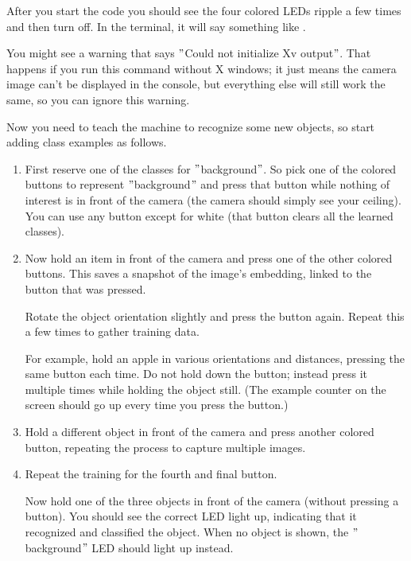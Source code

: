 After you start the code you should see the four colored LEDs ripple a few times and then turn off. In the terminal, it will say something like .

\begin{notes}
	\item You might see a warning that says $"$Could not initialize Xv output$"$. That happens if you run this command without X windows; it just means the camera image can't be displayed in the console, but everything else will still work the same, so you can ignore this warning.
\end{notes}


Now you need to teach the machine to recognize some new objects, so start adding class examples as follows.

\begin{enumerate}
	\item First reserve one of the classes for $"$background$"$. So pick one of the colored buttons to represent $"$background$"$ and press that button while nothing of interest is in front of the camera (the camera should simply see your ceiling). You can use any button except for white (that button clears all the learned classes).
	
	\item Now hold an item in front of the camera and press one of the other colored buttons. This saves a snapshot of the image's embedding, linked to the button that was pressed.
	
	\medskip
	
	Rotate the object orientation slightly and press the button again. Repeat this a few times to gather training data.
	
	\medskip
	
	For example, hold an apple in various orientations and distances, pressing the same button each time. Do not hold down the button; instead press it multiple times while holding the object still. (The example counter on the screen should go up every time you press the button.)
	
	
	\item Hold a different object in front of the camera and press another colored button, repeating the process to capture multiple images.
	
	
	\item Repeat the training for the fourth and final button.
	
	\medskip
	
	Now hold one of the three objects in front of the camera (without pressing a button). You should see the correct LED light up, indicating that it recognized and classified the object. When no object is shown, the $"$background$"$ LED should light up instead.
	

\end{enumerate}

